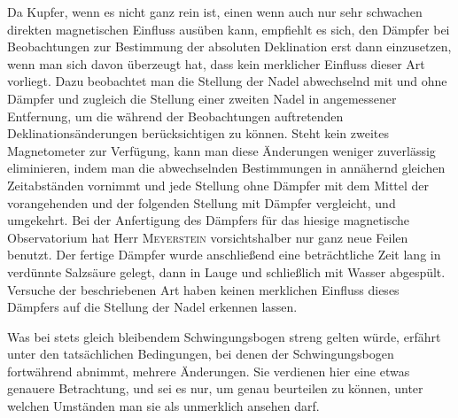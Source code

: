Da Kupfer, wenn es nicht ganz rein ist, einen wenn auch nur sehr schwachen direkten magnetischen Einfluss ausüben kann, empfiehlt es sich, den Dämpfer bei Beobachtungen zur Bestimmung der absoluten Deklination erst dann einzusetzen, wenn man sich davon überzeugt hat, dass kein merklicher Einfluss dieser Art vorliegt. Dazu beobachtet man die Stellung der Nadel abwechselnd mit und ohne Dämpfer und zugleich die Stellung einer zweiten Nadel in angemessener Entfernung, um die während der Beobachtungen auftretenden Deklinationsänderungen berücksichtigen zu können. Steht kein zweites Magnetometer zur Verfügung, kann man diese Änderungen weniger zuverlässig eliminieren, indem man die abwechselnden Bestimmungen in annähernd gleichen Zeitabständen vornimmt und jede Stellung ohne Dämpfer mit dem Mittel der vorangehenden und der folgenden Stellung mit Dämpfer vergleicht, und umgekehrt. Bei der Anfertigung des Dämpfers für das hiesige magnetische Observatorium hat Herr \textsc{Meyerstein} vorsichtshalber nur ganz neue Feilen benutzt. Der fertige Dämpfer wurde anschließend eine beträchtliche Zeit lang in verdünnte Salzsäure gelegt, dann in Lauge und schließlich mit Wasser abgespült. Versuche der beschriebenen Art haben keinen merklichen Einfluss dieses Dämpfers auf die Stellung der Nadel erkennen lassen.

Was bei stets gleich bleibendem Schwingungsbogen streng gelten würde, erfährt unter den tatsächlichen Bedingungen, bei denen der Schwingungsbogen fortwährend abnimmt, mehrere Änderungen. Sie verdienen hier eine etwas genauere Betrachtung, und sei es nur, um genau beurteilen zu können, unter welchen Umständen man sie als unmerklich ansehen darf.

